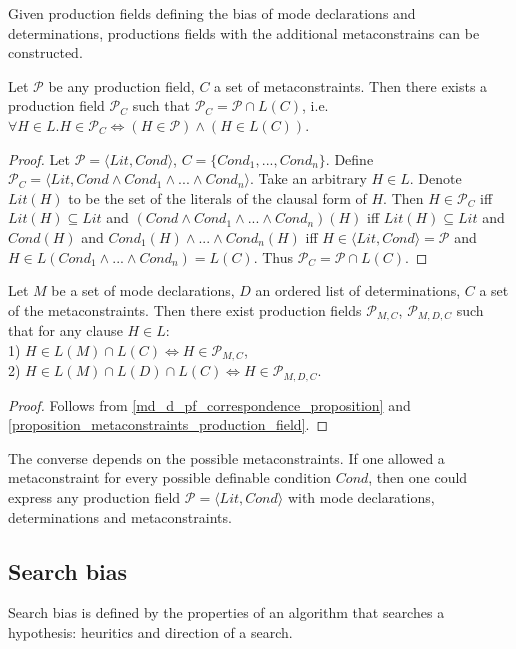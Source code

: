 Given production fields defining the bias of mode declarations and determinations, productions fields with the additional metaconstrains can be constructed.

\begin{proposition}\label{proposition_metaconstraints_production_field}
Let $\mathcal{P}$ be any production field, $C$ a set of metaconstraints.
Then there exists a production field $\mathcal{P}_C$ such that
$\mathcal{P}_C=\mathcal{P} \cap L(C)$, i.e.
$\forall H \in L. H \in \mathcal{P}_C \iff (H \in \mathcal{P}) \land (H \in L(C))$.
\end{proposition}
\begin{proof}
Let $\mathcal{P}=\langle Lit, Cond \rangle$,
$C=\{Cond_1, ..., Cond_n\}$.
Define $\mathcal{P}_C=\langle Lit, Cond \land Cond_1 \land ... \land Cond_n \rangle$. Take an arbitrary $H \in L$. Denote $Lit(H)$ to be the set of the literals of the clausal form of $H$.
Then $H \in \mathcal{P}_C$ iff $Lit(H) \subseteq Lit$ and
$(Cond \land Cond_1 \land ... \land Cond_n)(H)$ iff
$Lit(H) \subseteq Lit$ and $Cond(H)$ and $Cond_1(H) \land ... \land Cond_n(H)$
iff $H \in \langle Lit, Cond \rangle = \mathcal{P}$ and $H \in L(Cond_1 \land ... \land Cond_n) = L(C)$. Thus $\mathcal{P}_C=\mathcal{P} \cap L(C)$.
\end{proof}

\begin{corollary}
Let $M$ be a set of mode declarations, $D$ an ordered list of determinations, $C$ a set of the metaconstraints.
Then there exist production fields
$\mathcal{P}_{M,C}$,
$\mathcal{P}_{M,D,C}$
such that for any clause $H \in L$:\\
1) $H \in L(M) \cap L(C) \iff H \in \mathcal{P}_{M,C}$,\\
2) $H \in L(M) \cap L(D) \cap L(C) \iff H \in \mathcal{P}_{M,D,C}$.\\
\end{corollary}
\begin{proof}
Follows from \ref{md_d_pf_correspondence_proposition} and \ref{proposition_metaconstraints_production_field}.
\end{proof}

The converse depends on the possible metaconstraints. If one allowed a metaconstraint for every possible definable condition $Cond$, then one could express any production field $\mathcal{P}=\langle Lit, Cond \rangle$ with mode declarations, determinations and metaconstraints.

\subsection{Search bias\cite{nienhuys1997foundations}}
Search bias is defined by the properties of an algorithm that searches a hypothesis: heuritics and direction of a search.

